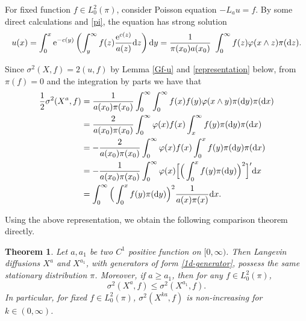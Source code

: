 \documentclass[12pt,reqno]{article}
\newtheorem{thm}{Theorem}[section]
\theoremstyle{definition}
\theoremstyle{remark}
\theoremstyle{example}
\numberwithin{equation}{section}
\def\d{\mathrm{d}}
\def\d{\rm d}
\def\bg{\begin}
\def\be{\bg{equation}}
\def\de{\end{equation}}
\def\lb{\label}
\def\d{{\mbox{\rm d}}}
\begin{document}
For fixed function $f\in L^2_0(\pi)$, consider Poisson equation $-L_au=f$.  By some direct calculations and \eqref{pi}, the equation has strong solution
$$			u(x)=\int_{0}^{x}\mathrm{e}^{-c(y)}\left(\int_{y}^{\infty}f(z)\frac{\mathrm{e}^{c(z)}}{a(z)}\mathrm{d}z\right)\mathrm{d}y
=\frac{1}{\pi(x_0)a(x_0)}\	\int_{0}^{\infty}f(z)\varphi(x\wedge z)\pi(\d z).
$$

Since $\sigma^2(X,f)=2(u,f)$ by Lemma \ref{Gf-u} and \eqref{representation} below, from $\pi(f)=0$ and the integration by parts we have that 
\be\lb{exp-reps}
\aligned \frac{1}{2}\sigma^2(X^a,f)&=\frac{1}{ a(x_0)\pi(x_0)}\int_{0}^{\infty}\int_{0}^{\infty}f(x)f(y)\varphi(x\wedge y)\pi(\d y)\pi(\d x)\\ &=\frac{2}{ a(x_0)\pi(x_0)}\int_{0}^{\infty}\varphi(x)f(x)\int_{x}^{\infty}f(y)\pi(\d y)\pi(\d x)\\
&=-\frac{2}{a(x_0)\pi(x_0)}\int_{0}^{\infty}\varphi(x)f(x)\int_{0}^{x}f(y)\pi(\d y)\pi(\d x)\\
&=-\frac{1}{ a(x_0)\pi(x_0)}\int_{0}^{\infty}\varphi(x)\Big[\Big(\int_0^x f(y)\pi(\d y)\Big)^2\Big]'\d x\\
&=\int_0^\infty\Big(\int_0^x f(y)\pi(\d y)\Big)^2\frac{1}{a(x)\pi(x)}\d x.
\endaligned
\de

Using the above representation, we obtain the following comparison theorem directly.

\begin{thm}\lb{compa-1}
Let $a,a_1$ be two $C^1$ positive function on $[0,\infty)$. Then Langevin diffusions $X^a$ and $X^{a_1}$, with generators of form \eqref{1d-generator}, possess the same stationary distribution $\pi$.
Moreover, if $a\geq a_1$, then for any $f\in L_0^2(\pi)$,
$$
		 \sigma^2(X^{a},f)\leq \sigma^2(X^{a_1},f).
$$
In particular, for fixed $f\in L^2_0(\pi)$, $\sigma^2(X^{ka},f)$ is non-increasing for $k\in(0,\infty)$.	
\end{thm}	
\end{document}
